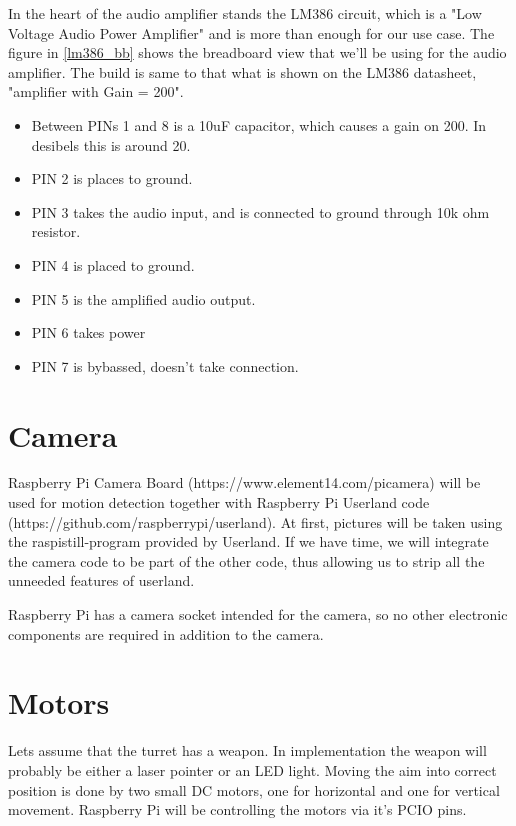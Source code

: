 \documentclass[english,11pt,twoside,a4paper]{article}
\begin{document}
In the heart of the audio amplifier stands the LM386 circuit, which is a "Low Voltage Audio Power Amplifier" and is more than enough for our use case. The figure in \ref{lm386_bb} shows the breadboard view that we'll be using for the audio amplifier. The build is same to that what is shown on the LM386 datasheet, "amplifier with Gain = 200". 

\begin{itemize}
  \item Between PINs 1 and 8 is a 10uF capacitor, which causes a gain on 200. In desibels this is around 20. 
  \item PIN 2 is places to ground.
  \item PIN 3 takes the audio input, and is connected to ground through 10k ohm resistor.
  \item PIN 4 is placed to ground.
  \item PIN 5 is the amplified audio output.
  \item PIN 6 takes power
  \item PIN 7 is bybassed, doesn't take connection.
\end{itemize}

\section{Camera}
Raspberry Pi Camera Board (https://www.element14.com/picamera) will be used for motion detection together with Raspberry Pi Userland code (https://github.com/raspberrypi/userland). At first, pictures will be taken using the raspistill-program provided by Userland. If we have time, we will integrate the camera code to be part of the other code, thus allowing us to strip all the unneeded features of userland.

Raspberry Pi has a camera socket intended for the camera, so no other electronic components are required in addition to the camera.

\section{Motors}
Lets assume that the turret has a weapon. In implementation the weapon will probably be either a laser pointer or an LED light. Moving the aim into correct position is done by two small DC motors, one for horizontal and one for vertical movement. Raspberry Pi will be controlling the motors via it's PCIO pins.
\end{document}
